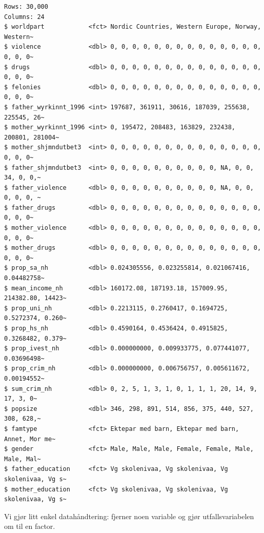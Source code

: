 \documentclass[
  letterpaper,
  DIV=11,
  numbers=noendperiod]{scrreprt}
\newenvironment{Shaded}{\begin{snugshade}}{\end{snugshade}}
\newcommand{\AttributeTok}[1]{\textcolor[rgb]{0.40,0.45,0.13}{#1}}
\newcommand{\FunctionTok}[1]{\textcolor[rgb]{0.28,0.35,0.67}{#1}}
\newcommand{\NormalTok}[1]{\textcolor[rgb]{0.00,0.23,0.31}{#1}}
\newcommand{\OtherTok}[1]{\textcolor[rgb]{0.00,0.23,0.31}{#1}}
\newcommand{\SpecialCharTok}[1]{\textcolor[rgb]{0.37,0.37,0.37}{#1}}
\begin{document}
\begin{verbatim}
Rows: 30,000
Columns: 24
$ worldpart            <fct> Nordic Countries, Western Europe, Norway, Western~
$ violence             <dbl> 0, 0, 0, 0, 0, 0, 0, 0, 0, 0, 0, 0, 0, 0, 0, 0, 0~
$ drugs                <dbl> 0, 0, 0, 0, 0, 0, 0, 0, 0, 0, 0, 0, 0, 0, 0, 0, 0~
$ felonies             <dbl> 0, 0, 0, 0, 0, 0, 0, 0, 0, 0, 0, 0, 0, 0, 0, 0, 0~
$ father_wyrkinnt_1996 <int> 197687, 361911, 30616, 187039, 255638, 225545, 26~
$ mother_wyrkinnt_1996 <int> 0, 195472, 208483, 163829, 232438, 200801, 281004~
$ mother_shjmndutbet3  <int> 0, 0, 0, 0, 0, 0, 0, 0, 0, 0, 0, 0, 0, 0, 0, 0, 0~
$ father_shjmndutbet3  <int> 0, 0, 0, 0, 0, 0, 0, 0, 0, 0, NA, 0, 0, 34, 0, 0,~
$ father_violence      <dbl> 0, 0, 0, 0, 0, 0, 0, 0, 0, 0, NA, 0, 0, 0, 0, 0, ~
$ father_drugs         <dbl> 0, 0, 0, 0, 0, 0, 0, 0, 0, 0, 0, 0, 0, 0, 0, 0, 0~
$ mother_violence      <dbl> 0, 0, 0, 0, 0, 0, 0, 0, 0, 0, 0, 0, 0, 0, 0, 0, 0~
$ mother_drugs         <dbl> 0, 0, 0, 0, 0, 0, 0, 0, 0, 0, 0, 0, 0, 0, 0, 0, 0~
$ prop_sa_nh           <dbl> 0.024305556, 0.023255814, 0.021067416, 0.04482758~
$ mean_income_nh       <dbl> 160172.08, 187193.18, 157009.95, 214382.80, 14423~
$ prop_uni_nh          <dbl> 0.2213115, 0.2760417, 0.1694725, 0.5272374, 0.260~
$ prop_hs_nh           <dbl> 0.4590164, 0.4536424, 0.4915825, 0.3268482, 0.379~
$ prop_ivest_nh        <dbl> 0.000000000, 0.009933775, 0.077441077, 0.03696498~
$ prop_crim_nh         <dbl> 0.000000000, 0.006756757, 0.005611672, 0.00194552~
$ sum_crim_nh          <dbl> 0, 2, 5, 1, 3, 1, 0, 1, 1, 1, 20, 14, 9, 17, 3, 0~
$ popsize              <dbl> 346, 298, 891, 514, 856, 375, 440, 527, 308, 628,~
$ famtype              <fct> Ektepar med barn, Ektepar med barn, Annet, Mor me~
$ gender               <fct> Male, Male, Male, Female, Female, Male, Male, Mal~
$ father_education     <fct> Vg skolenivaa, Vg skolenivaa, Vg skolenivaa, Vg s~
$ mother_education     <fct> Vg skolenivaa, Vg skolenivaa, Vg skolenivaa, Vg s~
\end{verbatim}

Vi gjør litt enkel datahåndtering: fjerner noen variable og gjør
utfallsvariabelen om til en factor.

\begin{Shaded}
\end{Shaded}
\end{document}
